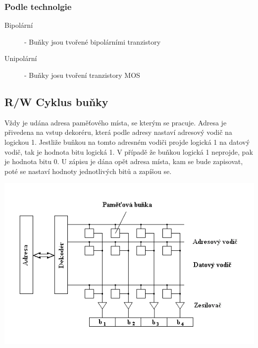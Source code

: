 \subsubsection{Podle technolgie}
\begin{description}
  \item[Bipolární] - Buňky jsou tvořené bipolárními tranzistory
  \item[Unipolární] - Buňky josu tvoření tranzistory MOS
\end{description}
\subsection{R/W Cyklus buňky}
Vždy je udána adresa paměťového místa, se kterým se pracuje.
Adresa je přivedena na vstup dekoréru, která podle adresy nastaví adresový vodič na logickou 1.
Jestliže buňkou na tomto adresném vodiči projde logická 1 na datový vodič, tak je hodnota bitu logická 1.
V případě že buňkou logická 1 neprojde, pak je hodnota bitu 0.
U zápisu je dána opět adresa místa, kam se bude zapisovat, poté se nastaví hodnoty jednotlivých bitů a zapíšou se.

\includegraphics[width=\linewidth]{TVY-POS/Polovodicove-pameti/memorystructure.png}